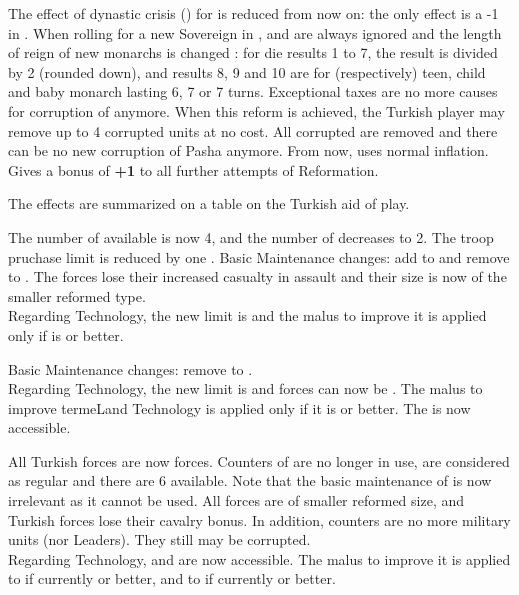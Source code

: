 The effect of dynastic crisis () for
\TUR is reduced from now on: the only effect is a -1 in \STAB.  When
rolling for a new Sovereign in , \DC and
 are always ignored and the length of reign of new
monarchs is changed : for die results 1 to 7, the result is divided by 2
(rounded down), and results 8, 9 and 10 are for (respectively) teen,
child and baby monarch lasting 6, 7 or 7 turns.
Exceptional taxes are no more causes for corruption of \Pasha
anymore. When this reform is achieved, the Turkish player may remove up
to 4 corrupted \Pasha units at no cost.
All corrupted \Pashas are removed and there can be no new corruption of
Pasha anymore. From now, \TUR uses normal inflation. Gives a bonus
of {\bf +1} to all further attempts of Reformation.

 The effects are summarized on a table on the
Turkish aid of play.

The number of \Janissaire \ARMY available is now 4, and the number of
\Timar \ARMY decreases to 2. The troop pruchase limit is reduced by one \LD.
Basic Maintenance changes: add \ARMY\facemoins to \Janissaire and
remove \ARMY\faceplus to \Timar.
The \Janissaire forces lose their increased casualty
in assault and their size is now of the smaller reformed type.
\\
Regarding Technology, the new limit is \TBAR and the malus to improve
it is applied only if  is \TMUS or better.

Basic Maintenance changes: remove \ARMY\faceplus to \Timar.
\\
Regarding Technology, the new limit is \TMUS and \Timar forces can now
be \TMUS.  The malus to improve terme{Land Technology} is applied only
if it is \TMUS or better.  The  \TBAT is now
accessible.

All Turkish forces are now \Janissaire forces.  Counters of \Timar \ARMY
are no longer in use, \Timar \LD are considered as regular \Janissaire
and there are 6 \Janissaire\ARMY available.  Note that the basic
maintenance of \Timar is now irrelevant as it cannot be used.  All
forces are of smaller reformed size, and Turkish forces lose their
cavalry bonus.  In addition, \Pasha counters are no more military units
(nor Leaders). They still may be corrupted.
\\
Regarding Technology, \TMAN and \TTD are now accessible.  The malus to
improve it is applied to  if currently \TBAR or
better, and to  if currently \TBAT or better.

